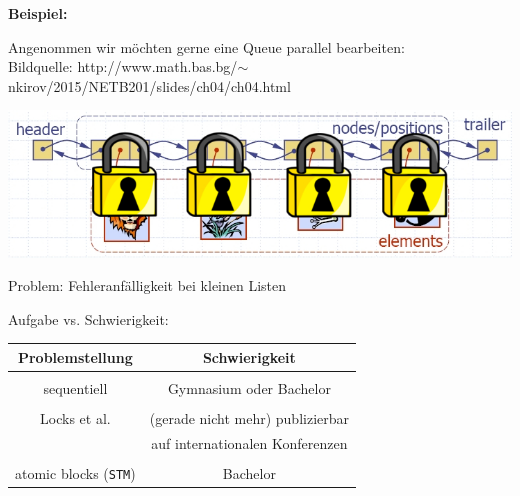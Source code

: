 \documentclass{beamer}
\begin{document}

\begin{frame}

\textbf{Beispiel:}\bigskip

Angenommen wir möchten gerne eine Queue parallel bearbeiten:\\
\tiny Bildquelle: http://www.math.bas.bg/$\sim$nkirov/2015/NETB201/slides/ch04/ch04.html \normalsize

\begin{center}
\includegraphics[scale=0.35]{liste_individually_locked.jpg} 
\end{center}
\pause

Problem: Fehleranfälligkeit bei kleinen Listen

\end{frame}


\begin{frame}

Aufgabe vs. Schwierigkeit:\bigskip

\begin{center}
\begin{tabular}{c|c}
Problemstellung & Schwierigkeit \\
\hline \\
sequentiell & Gymnasium oder Bachelor \pause \\ \\
Locks et al. & (gerade nicht mehr) publizierbar \\ & auf internationalen Konferenzen \pause \\ \\
atomic blocks (\texttt{STM}) & Bachelor
\end{tabular}
\end{center}

\end{frame}

\end{document}
